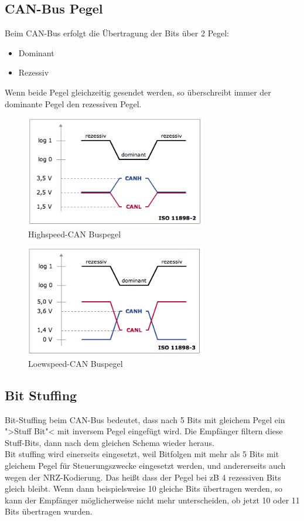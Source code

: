 \clearpage
\subsection{CAN-Bus Pegel} Beim CAN-Bus erfolgt die Übertragung der
Bits über 2 Pegel: 
\begin{itemize} 
\item Dominant 
\item Rezessiv
\end{itemize}

Wenn beide Pegel gleichzeitig gesendet werden, so überschreibt immer
der dominante Pegel den rezessiven Pegel.

\begin{figure}[h] 
\centering
\includegraphics[width=0.7\textwidth]{figures/highcan}
\caption{Highspeed-CAN Buspegel \citep{VEC}} 
\label{pic:highcan}
\end{figure} 

\begin{figure}[h] 
\centering
\includegraphics[width=0.7\textwidth]{figures/lowcan}
\caption{Loewspeed-CAN Buspegel \citep{VEC}} 
\label{pic:lowcan}
\end{figure} 
	
\subsection{Bit Stuffing}
\label{sec:bitstuffing} 
Bit-Stuffing beim CAN-Bus bedeutet, dass
nach 5 Bits mit gleichem Pegel ein ">Stuff Bit"< mit inversem Pegel
eingefügt wird. Die Empfänger filtern diese Stuff-Bits, dann nach dem
gleichen Schema wieder heraus.
\\ Bit stuffing wird einerseits
eingesetzt, weil Bitfolgen mit mehr als 5 Bits mit gleichem Pegel für
Steuerungszwecke eingesetzt werden, und andererseits auch wegen der
NRZ-Kodierung. Das heißt dass der Pegel bei zB 4 rezessiven Bits
gleich bleibt. Wenn dann beispielsweise 10 gleiche Bits übertragen
werden, so kann der Empfänger möglicherweise nicht mehr unterscheiden,
ob jetzt 10 oder 11 Bits übertragen wurden.
	

